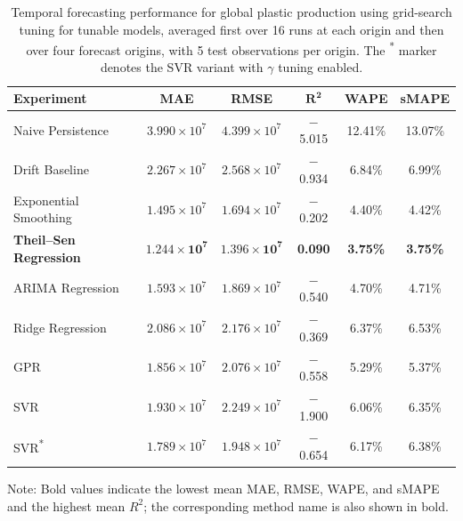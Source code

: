 \begin{table}[H]
	\caption{
	Temporal forecasting performance for global plastic production using grid-search tuning for tunable models, averaged first over 16 runs at each origin and then over four forecast origins, with 5 test observations per origin. The \textsuperscript{*} marker denotes the SVR variant with \(\gamma\) tuning enabled.
	}
	\begin{tabularx}{\textwidth}{lccccc}
		\toprule
		\textbf{Experiment} & \textbf{MAE} & \textbf{RMSE} & $\mathbf{R^2}$ & \textbf{WAPE} & \textbf{sMAPE} \\
		\midrule
		Naive Persistence & \(3.990 \times 10^{7}\) & \(4.399 \times 10^{7}\) & $-$5.015 & 12.41\% & 13.07\% \\
		Drift Baseline & \(2.267 \times 10^{7}\) & \(2.568 \times 10^{7}\) & $-$0.934 & 6.84\% & 6.99\% \\
		Exponential Smoothing & \(1.495 \times 10^{7}\) & \(1.694 \times 10^{7}\) & $-$0.202 & 4.40\% & 4.42\% \\
		\textbf{Theil--Sen Regression} & \(\mathbf{1.244 \times 10^{7}}\) & \(\mathbf{1.396 \times 10^{7}}\) & \textbf{0.090} & \textbf{3.75\%} & \textbf{3.75\%} \\
		ARIMA Regression & \(1.593 \times 10^{7}\) & \(1.869 \times 10^{7}\) & $-$0.540 & 4.70\% & 4.71\% \\
		Ridge Regression & \(2.086 \times 10^{7}\) & \(2.176 \times 10^{7}\) & $-$0.369 & 6.37\% & 6.53\% \\
		GPR & \(1.856 \times 10^{7}\) & \(2.076 \times 10^{7}\) & $-$0.558 & 5.29\% & 5.37\% \\
		SVR & \(1.930 \times 10^{7}\) & \(2.249 \times 10^{7}\) & $-$1.900 & 6.06\% & 6.35\% \\
		SVR\textsuperscript{*} & \(1.789 \times 10^{7}\) & \(1.948 \times 10^{7}\) & $-$0.654 & 6.17\% & 6.38\% \\
		\bottomrule
	\end{tabularx}
	\smallskip
	{\footnotesize
	Note: Bold values indicate the lowest mean MAE, RMSE, WAPE, and sMAPE and the highest mean \(R^2\); the corresponding method name is also shown in bold.\par
	}
	\label{tab:global_forecasting_grid_search_metrics}
\end{table}
